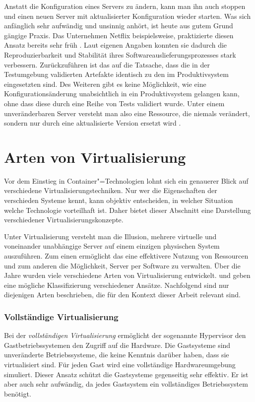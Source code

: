 Anstatt die Konfiguration eines Servers zu ändern, kann man ihn auch stoppen und einen neuen Server mit aktualisierter Konfiguration wieder starten. Was sich anfänglich sehr aufwändig und unsinnig anhört, ist heute aus gutem Grund gängige Praxis. Das Unternehmen Netflix beispielsweise, praktizierte diesen Ansatz bereits sehr früh \cite{NflxLegos}. Laut eigenen Angaben konnten sie dadurch die Reproduzierbarkeit und Stabilität ihres Softwareauslieferungsprozesses stark verbessern. Zurückzuführen ist das auf die Tatsache, dass die in der Testumgebung validierten Artefakte identisch zu den im Produktivsystem eingesetzten sind. Des Weiteren gibt es keine Möglichkeit, wie eine Konfigurationsänderung unabsichtlich in ein Produktivsystem gelangen kann, ohne dass diese durch eine Reihe von Tests validiert wurde. Unter einem unveränderbaren Server versteht man also eine Ressource, die niemals verändert, sondern nur durch eine aktualisierte Version ersetzt wird \cite{ImmutableServer}.

\section{Arten von Virtualisierung}

Vor dem Einstieg in Container"=Technologien lohnt sich ein genauerer Blick auf verschiedene Virtualisierungstechniken. Nur wer die Eigenschaften der verschieden Systeme kennt, kann objektiv entscheiden, in welcher Situation welche Technologie vorteilhaft ist. Daher bietet dieser Abschnitt eine Darstellung verschiedener Virtualisierungskonzepte.

Unter Virtualisierung versteht man die Illusion, mehrere virtuelle und voneinander unabhängige Server auf einem einzigen physischen System auszuführen. Zum einen ermöglicht das eine effektivere Nutzung von Ressourcen und zum anderen die Möglichkeit, Server per Software zu verwalten. Über die Jahre wurden viele verschiedene Arten von Virtualisierung entwickelt. \cite{VirtualizationBasics} und \cite{Smith:2005:AVM:1069588.1069632} geben eine mögliche Klassifizierung verschiedener Ansätze.
Nachfolgend sind nur diejenigen Arten beschrieben, die für den Kontext dieser Arbeit relevant sind.

\subsubsection{Vollständige Virtualisierung}

Bei der \textit{vollständigen Virtualisierung} ermöglicht der sogenannte Hypervisor den Gastbetriebssystemen den Zugriff auf die Hardware. Die Gastsysteme sind unveränderte Betriebssysteme, die keine Kenntnis darüber haben, dass sie virtualisiert sind. Für jeden Gast wird eine vollständige Hardwareumgebung simuliert. Dieser Ansatz schützt die Gastsysteme gegenseitig sehr effektiv. Er ist aber auch sehr aufwändig, da jedes Gastsystem ein vollständiges Betriebssystem benötigt.

